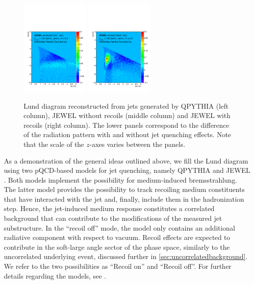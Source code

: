 \begin{figure}[h]
\includegraphics[width=0.3\textwidth]{figures/LundMC/FinalPlots/Jewel_Diff_RecoilOff.pdf}
\includegraphics[width=0.3\textwidth]{figures/LundMC/FinalPlots/Jewel_Diff_RecoilOn.pdf}
\caption{Lund diagram reconstructed from jets generated by QPYTHIA (left column), JEWEL without recoils (middle column) and JEWEL with recoils (right column).
The lower panels correspond to the difference of the radiation pattern with and without jet quenching effects. Note that the scale of the $z$-axes varies between the panels.}
\label{fig:PS2}
\end{figure}
As a demonstration of the general ideas outlined above, we fill the Lund diagram using 
two pQCD-based models for jet quenching, namely QPYTHIA \cite{Armesto:2009fj} and JEWEL \cite{Zapp:2011ya,Zapp:2012ak}. 
Both models implement the possibility for medium-induced bremsstrahlung. The latter model provides the possibility to track recoiling medium constituents that have interacted with the jet and, finally, include them in the hadronization step. 
Hence, the jet-induced medium response constitutes a correlated background that can contribute to the modifications of the measured jet substructure. In the ``recoil off'' mode, the model only contains an additional radiative component with respect to vacuum.
Recoil effects are expected to contribute in the soft-large angle sector of the phase space, similarly to the uncorrelated underlying event, discussed further in \autoref{sec:uncorrelatedbackground}.
We refer to the two possibilities as ``Recoil on'' and ``Recoil off''. For further details regarding the models, see .

